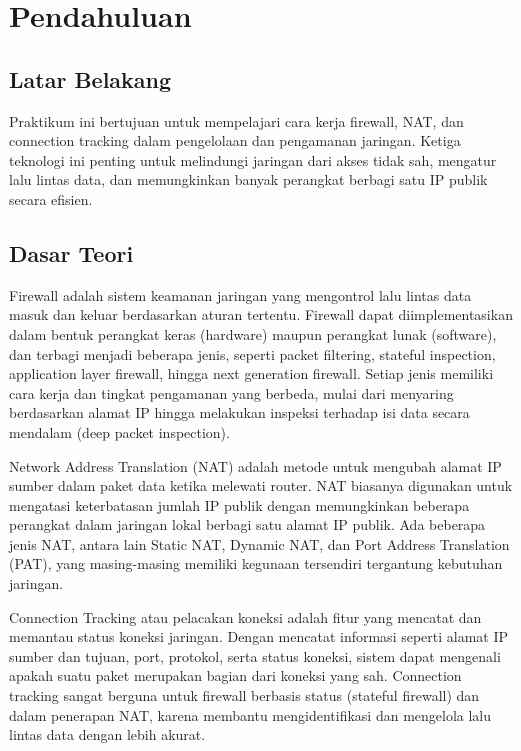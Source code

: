 \section{Pendahuluan}
\subsection{Latar Belakang}
Praktikum ini bertujuan untuk mempelajari cara kerja firewall, NAT, dan connection tracking dalam pengelolaan dan pengamanan jaringan. Ketiga teknologi ini penting untuk melindungi jaringan dari akses tidak sah, mengatur lalu lintas data, dan memungkinkan banyak perangkat berbagi satu IP publik secara efisien.


\subsection{Dasar Teori}
Firewall adalah sistem keamanan jaringan yang mengontrol lalu lintas data masuk dan keluar berdasarkan aturan tertentu. Firewall dapat diimplementasikan dalam bentuk perangkat keras (hardware) maupun perangkat lunak (software), dan terbagi menjadi beberapa jenis, seperti packet filtering, stateful inspection, application layer firewall, hingga next generation firewall. Setiap jenis memiliki cara kerja dan tingkat pengamanan yang berbeda, mulai dari menyaring berdasarkan alamat IP hingga melakukan inspeksi terhadap isi data secara mendalam (deep packet inspection).

Network Address Translation (NAT) adalah metode untuk mengubah alamat IP sumber dalam paket data ketika melewati router. NAT biasanya digunakan untuk mengatasi keterbatasan jumlah IP publik dengan memungkinkan beberapa perangkat dalam jaringan lokal berbagi satu alamat IP publik. Ada beberapa jenis NAT, antara lain Static NAT, Dynamic NAT, dan Port Address Translation (PAT), yang masing-masing memiliki kegunaan tersendiri tergantung kebutuhan jaringan.

Connection Tracking atau pelacakan koneksi adalah fitur yang mencatat dan memantau status koneksi jaringan. Dengan mencatat informasi seperti alamat IP sumber dan tujuan, port, protokol, serta status koneksi, sistem dapat mengenali apakah suatu paket merupakan bagian dari koneksi yang sah. Connection tracking sangat berguna untuk firewall berbasis status (stateful firewall) dan dalam penerapan NAT, karena membantu mengidentifikasi dan mengelola lalu lintas data dengan lebih akurat.

